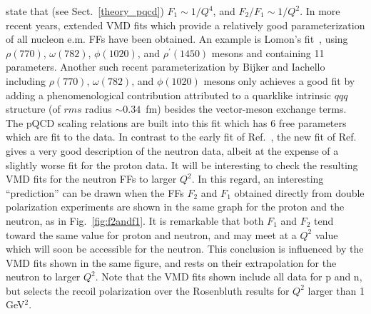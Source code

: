 state that (see Sect.~\ref{theory_pqcd}) $F_1 \sim 1/Q^4$, and  
$F_2 / F_1 \sim 1/Q^2$.
\newline
\indent
In more recent years, extended VMD fits which provide 
a relatively good parameterization of  
all nucleon e.m. FFs have been obtained. An example is Lomon's 
fit~\cite{lomon}, using $\rho(770)$, $\omega(782)$, $\phi(1020)$, 
and $\rho^\prime(1450)$ mesons and containing 11 parameters. 
Another such recent parameterization 
by Bijker and Iachello~\cite{bijker} including 
$\rho(770)$, $\omega(782)$, and $\phi(1020)$ mesons only achieves a 
good fit by adding a phenomenological contribution attributed to a 
quarklike intrinsic $qqq$ structure (of $rms$ radius $\sim 0.34$~fm) 
besides the vector-meson exchange terms. The pQCD scaling relations are 
built into this fit which has 6 free parameters which are fit to the data. 
In contrast to the early fit of Ref.~\cite{iach}, the new fit of 
Ref.~\cite{bijker} gives a very good description of the neutron data, 
albeit at the expense of a slightly worse fit for the proton data. 
\newline 
\indent
It will be interesting to check the resulting VMD fits 
for the neutron FFs to larger $Q^2$. 
In this regard, an interesting ``prediction'' can be drawn when the FFs 
$F_2$ and $F_1$ obtained directly from double
polarization experiments are shown in the same graph for the 
proton and the neutron, as in Fig.~\ref{fig:f2andf1}. 
It is remarkable that both $F_1$ and $F_2$ tend toward the 
same value for proton and neutron, and may meet at a $Q^2$ value 
which will soon be accessible for the neutron. 
This conclusion is influenced by the VMD fits shown in the same figure, 
and rests on their extrapolation for the neutron to larger $Q^2$.  
Note that the VMD fits shown include all data for p and n, 
but selects the recoil polarization over the Rosenbluth results 
for $Q^2$ larger than 1 GeV$^2$.  



